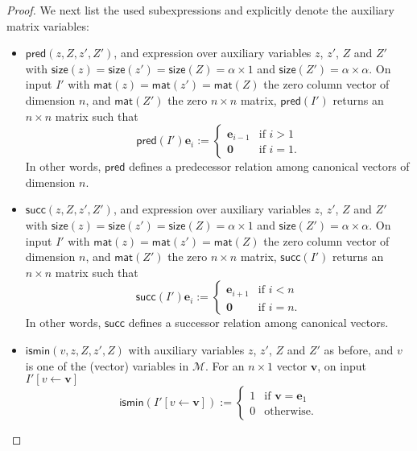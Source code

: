 \begin{proof}
We next list the used subexpressions and explicitly denote the auxiliary matrix variables:
\begin{itemize}
	\item $\mathsf{pred}(z,Z,z',Z')$, and expression over auxiliary variables $z$, $z'$, $Z$ and $Z'$ with 
	$\mathsf{size}(z)=\mathsf{size}(z')=\mathsf{size}(Z)=\alpha\times 1$ and 
	$\mathsf{size}(Z')=\alpha\times\alpha$. On input $I'$ with 
	$\mathsf{mat}(z)=\mathsf{mat}(z')=\mathsf{mat}(Z)$ the zero column vector of dimension $n$, 
	and $\mathsf{mat}(Z')$ the zero $n\times n$ matrix,
	$\mathsf{pred}(I')$ returns an $n\times n$ matrix such that 
	$$\mathsf{pred}(I')\mathbf{e}_i:=\begin{cases} 
	\mathbf{e}_{i-1} & \text{if $i>1$}\\
	\mathbf{0} & \text{if $i=1$}.
	\end{cases}
	$$
	In other words, $\mathsf{pred}$ defines a predecessor relation among canonical vectors of dimension $n$.
	\item $\mathsf{succ}(z,Z,z',Z')$, and expression over auxiliary variables $z$, $z'$, $Z$ and $Z'$ 
	with $\mathsf{size}(z)=\mathsf{size}(z')=\mathsf{size}(Z)=\alpha\times 1$ and 
	$\mathsf{size}(Z')=\alpha\times\alpha$. On input $I'$ with 
	$\mathsf{mat}(z)=\mathsf{mat}(z')=\mathsf{mat}(Z)$ the zero column 
	vector of dimension $n$, and $\mathsf{mat}(Z')$ the zero $n\times n$ matrix,
	$\mathsf{succ}(I')$ returns an $n\times n$ matrix such that 
	$$\mathsf{succ}(I')\mathbf{e}_i:=\begin{cases} 
	\mathbf{e}_{i+1} & \text{if $i<n$}\\
	\mathbf{0} & \text{if $i=n$}.
	\end{cases}
	$$
	In other words, $\mathsf{succ}$ defines a successor relation among canonical vectors.
	\item $\textsf{ismin}(v,z,Z,z',Z)$ with auxiliary variables $z$, $z'$, $Z$ and $Z'$ as before, 
	and $v$ is one of the (vector) variables in $\mathcal{M}$. For an $n\times 1$ vector $\mathbf{v}$, 
	on input $I'[v\gets \mathbf{v}]$	$$\mathsf{ismin}(I'[v\gets\mathbf{v}]):=\begin{cases} 1 & \text{if $\mathbf{v}=\mathbf{e}_1$}\\
		0 & \text{otherwise}.
		\end{cases}$$


\end{itemize}
\end{proof}
